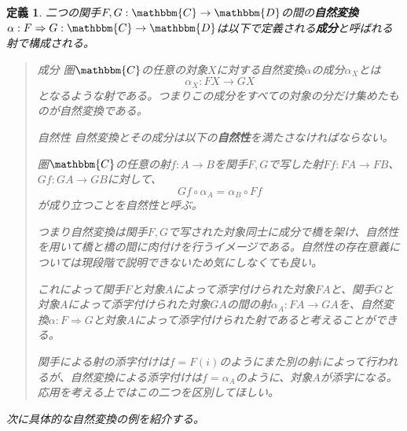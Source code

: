 \documentclass[uplatex,dvipdfmx]{jsarticle}
\newcommand{\cat}[1]{\mathbbm{#1}}
\newcommand{\arrow}{\rightarrow}
\newcommand{\functor}[3]{#1:\cat{#2}\arrow \cat{#3}}
\newcommand{\nat}[3]{#1:#2\Rightarrow #3}
\newcommand{\natf}[5]{#1:#2\Rightarrow #3:\cat{#4}\arrow \cat{#5}}
\newcommand{\mor}[3]{#1:#2\arrow #3}
\newtheorem{define}[proof]{定義}
\numberwithin{proof}{subsection}
\newenvironment{mydescription}
{\begin{description}
  \setlength{\parskip}{0.5cm}
}
{\end{description}}
\begin{document}
  \begin{define}
		二つの関手$\functor{F,G}{C}{D}$の間の\textbf{自然変換}$\natf{\alpha}{F}{G}{C}{D}$は以下で定義される\textbf{成分}と呼ばれる射で構成される。
		\begin{quote}
			\begin{mydescription}
				\item[成分] 圏$\cat{C}$の任意の対象$X$に対する自然変換$\alpha$の成分$\alpha_X$とは\[\mor{\alpha_X}{FX}{GX}\]となるような射である。つまりこの成分をすべての対象の分だけ集めたものが自然変換である。
				\item[自然性]
				自然変換とその成分は以下の\textbf{自然性}を満たさなければならない。

				圏$\cat{C}$の任意の射$\mor{f}{A}{B}$を関手$F,G$で写した射$\mor{Ff}{FA}{FB}$、$\mor{Gf}{GA}{GB}$に対して、\[Gf\circ\alpha_A=\alpha_B\circ Ff\]が成り立つことを自然性と呼ぶ。
				\begin{center}
				\end{center}
				つまり自然変換は関手$F,G$で写された対象同士に成分で橋を架け、自然性を用いて橋と橋の間に肉付けを行うイメージである。自然性の存在意義については現段階で説明できないため気にしなくても良い。
        
        これによって関手$F$と対象$A$によって添字付けられた対象$FA$と、関手$G$と対象$A$によって添字付けられた対象$GA$の間の射$\mor{\alpha_A}{FA}{GA}$を、自然変換$\nat{\alpha}{F}{G}$と対象$A$によって添字付けられた射であると考えることができる。

        関手による射の添字付けは$f=F(i)$のようにまた別の射$i$によって行われるが、自然変換による添字付けは$f=\alpha_A$のように、対象$A$が添字になる。応用を考える上ではこの二つを区別してほしい。
			\end{mydescription}
		\end{quote}
		次に具体的な自然変換の例を紹介する。
	\end{define}
\end{document}
